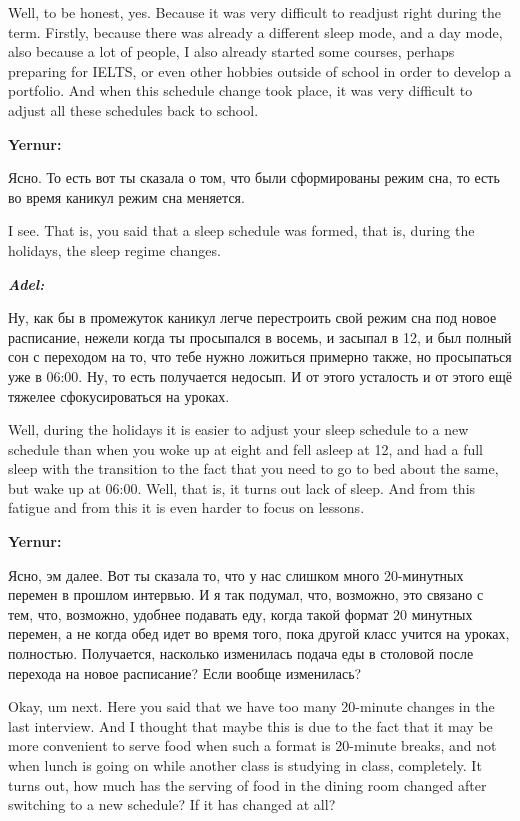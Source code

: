 Well, to be honest, yes. Because it was very difficult to readjust right during the term. Firstly, because there was already a different sleep mode, and a day mode, also because a lot of people, I also already started some courses, perhaps preparing for IELTS, or even other hobbies outside of school in order to develop a portfolio. And when this schedule change took place, it was very difficult to adjust all these schedules back to school.

\textbf{Yernur:}

Ясно. То есть вот ты сказала о том, что были сформированы режим сна, то есть во время каникул режим сна меняется.

I see. That is, you said that a sleep schedule was formed, that is, during the holidays, the sleep regime changes.

\textbf{\textit{Adel:}}

Ну, как бы в промежуток каникул легче перестроить свой режим сна под новое  расписание, нежели когда ты просыпался в восемь, и засыпал в 12, и был полный сон с переходом на то, что тебе нужно ложиться примерно также, но просыпаться уже в 06:00. Ну, то есть получается недосып. И от этого усталость и от этого ещё тяжелее сфокусироваться на уроках.

Well, during the holidays it is easier to adjust your sleep schedule to a new schedule than when you woke up at eight and fell asleep at 12, and had a full sleep with the transition to the fact that you need to go to bed about the same, but wake up at 06:00. Well, that is, it turns out lack of sleep. And from this fatigue and from this it is even harder to focus on lessons.

\textbf{Yernur:}

Ясно, эм далее. Вот ты сказала то, что у нас слишком много 20-минутных перемен в прошлом интервью. И я так подумал, что, возможно, это связано с тем, что, возможно, удобнее подавать еду, когда такой формат 20 минутных перемен, а не когда обед идет во время того, пока другой класс учится на уроках, полностью. Получается, насколько изменилась подача еды в столовой после перехода на новое расписание? Если вообще изменилась?

Okay, um next. Here you said that we have too many 20-minute changes in the last interview. And I thought that maybe this is due to the fact that it may be more convenient to serve food when such a format is 20-minute breaks, and not when lunch is going on while another class is studying in class, completely. It turns out, how much has the serving of food in the dining room changed after switching to a new schedule? If it has changed at all?

